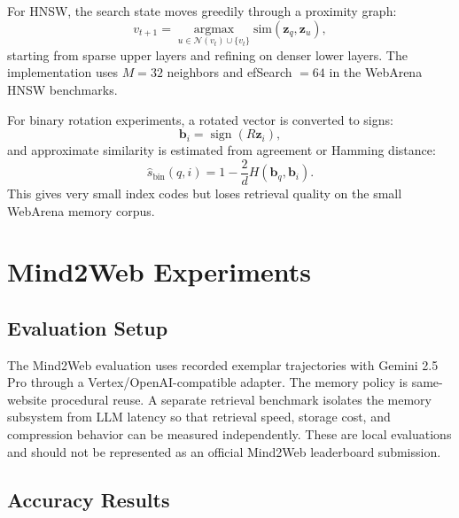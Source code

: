\documentclass[11pt]{article}
\newcommand{\vect}[1]{\mathbf{#1}}
\newcommand{\simfn}{\mathrm{sim}}
\begin{document}
For HNSW, the search state moves greedily through a proximity graph:
\begin{equation}
  v_{t+1}=\operatorname*{argmax}_{u\in \mathcal{N}(v_t)\cup\{v_t\}} \simfn(\vect{z}_q,\vect{z}_u),
\end{equation}
starting from sparse upper layers and refining on denser lower layers. The implementation uses $M=32$ neighbors and efSearch $=64$ in the WebArena HNSW benchmarks.

For binary rotation experiments, a rotated vector is converted to signs:
\begin{equation}
  \vect{b}_i = \operatorname{sign}(R\vect{z}_i),
\end{equation}
and approximate similarity is estimated from agreement or Hamming distance:
\begin{equation}
  \widehat{s}_{\mathrm{bin}}(q,i)=1-\frac{2}{d}H\left(\vect{b}_q,\vect{b}_i\right).
\end{equation}
This gives very small index codes but loses retrieval quality on the small WebArena memory corpus.

\section{Mind2Web Experiments}

\subsection{Evaluation Setup}

The Mind2Web evaluation uses recorded exemplar trajectories with Gemini 2.5 Pro through a Vertex/OpenAI-compatible adapter. The memory policy is same-website procedural reuse. A separate retrieval benchmark isolates the memory subsystem from LLM latency so that retrieval speed, storage cost, and compression behavior can be measured independently. These are local evaluations and should not be represented as an official Mind2Web leaderboard submission.

\subsection{Accuracy Results}
\end{document}

